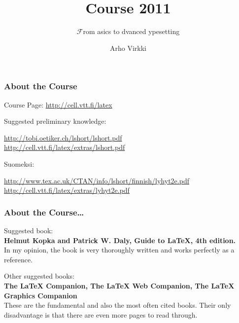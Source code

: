 \documentclass[13pt]{beamer}
\newcommand{\baseurl}{http://cell.vtt.fi/latex}
\begin{document}
\title{\scalebox{1.5}{\textrm{\LaTeX}} Course 2011}
\subtitle{$\mathcal{F}$rom \scalebox{1.2}{$\beta$}asics to
\scalebox{1.2}{$\alpha$}dvanced
\scalebox{1.2}{$\tau$}ypesetting}
\author{Arho Virkki}
\date{\scalebox{0.8}{\textcolor{gray}{2011-10-04}}}

\begin{frame}
  \titlepage
\end{frame}


\begin{frame}\frametitle{About the Course}
\begin{block}{Course Page:}
\url{\baseurl}
\end{block}\bigskip

Suggested preliminary knowledge:\smallskip

\url{http://tobi.oetiker.ch/lshort/lshort.pdf}\\
 \url{\baseurl/extras/lshort.pdf}\bigskip

Suomeksi:\smallskip

\hspace*{-1em}
\url{http://www.tex.ac.uk/CTAN/info/lshort/finnish/lyhyt2e.pdf}\\
\hspace*{-1em}
\url{\baseurl/extras/lyhyt2e.pdf} \bigskip

\end{frame}


\begin{frame}\frametitle{About the Course\dots}
Suggested book: \\
\textbf{Helmut Kopka and Patrick W. Daly, Guide to LaTeX,
4th edition.} \\
In my opinion, the book is very thoroughly written and works 
perfectly as a reference.\bigskip

Other suggested books: \\
\textbf{The LaTeX Companion, The LaTeX Web Companion, The LaTeX Graphics
Companion} \\
These are the fundamental and also the most often cited books. Their only
disadvantage is that there are even more pages to read through. 
\end{frame}
\end{document}
